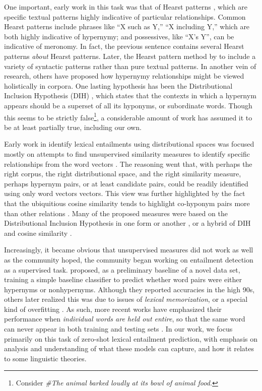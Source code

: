 \documentclass[letterpaper]{article}
\begin{document}
One important, early work in this task was that of Hearst patterns
\cite{hearst:1992:coling}, which are specific textual patterns highly
indicative of particular relationships. Common Hearst patterns include
phrases like ``X such as Y,'' ``X including Y,'' which are both highly
indicative of hypernymy; and possessives, like ``X's Y'', can be indicative
of meronomy. In fact, the previous sentence contains several Hearst patterns
{\em about} Hearst patterns. Later, the Hearst pattern method by
 to include a variety of syntactic patterns rather than
pure textual patterns. In another vein of research, others have proposed how
hypernymy relationships might be viewed holistically in corpora. One
lasting hypothesis has been the Distributional Inclusion Hypothesis (DIH)
\cite{zhitomirsky-geffet:2005:acl}, which states that the contexts in which a
hypernym appears should be a superset of all its hyponyms, or subordinate
words. Though this seems to be strictly false\footnote{Consider {\em \#The animal
barked loudly at its bowl of animal food.}}, a considerable amount of work has
assumed it to be at least partially true, including our own.

Early work in identify lexical entailments using distributional spaces was
focused mostly on attempts to find unsupervised similarity measures to identify
specific relationships from the word vectors
\cite{weeds:2004:coling,clarke:2009:gems,kotlerman:2010:nle,lenci:2012:starsem,santus:2013:thesis}.
The reasoning went that, with perhaps the right corpus, the right
distributional space, and the right similarity measure, perhaps hypernym pairs,
or at least candidate pairs, could be readily identified using only word
vectors vectors. This view was further highlighted by the fact that the
ubiquitious cosine similarity tends to highlight co-hyponym pairs more than
other relations \cite{baroni:2011:gems}. Many of the proposed measures were
based on the Distributional Inclusion Hypothesis in one form or another
\cite{clarke:2009:gems}, or a hybrid of DIH and cosine similarity
\cite{kotlerman:2010:nle,lenci:2012:starsem}.

Increasingly, it became obvious that unsupervised measures did not work
as well as the community hoped, the community began working
on entailment detection as a supervised task. 
proposed, as a preliminary baseline of a novel data set, training a simple
baseline classifier to predict whether word pairs were either hypernyms or
nonhypernyms. Although they reported accuracies in the high 90s, others
later realized this was due to issues of {\em lexical memorization}, or
a special kind of overfitting
\cite{roller:2014:coling,weeds:2014:coling,levy:2015:naacl}. As such, more
recent works have emphasized their performance when {\em individual words are
held out entire}, so that the same word can never appear in both training
and testing sets \cite{roller:2014:coling,kruszewski:2015:tacl,levy:2015:naacl}.
In our work, we focus primarily on this task of zero-shot lexical entailment
prediction, with emphasis on analysis and understanding of what these models
can capture, and how it relates to some linguistic theories.
\end{document}
